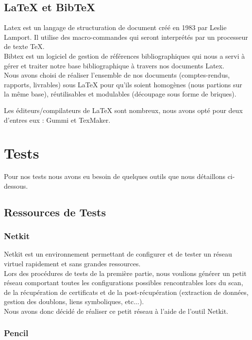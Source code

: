 \subsection{LaTeX et BibTeX}

Latex est un langage de structuration de document créé en 1983 par Leslie Lamport. Il utilise des macro-commandes qui seront interprétés par un processeur de texte TeX.\\
Bibtex est un logiciel de gestion de références bibliographiques qui nous a servi à gérer et traiter notre base bibliographique à travers nos documents Latex.\\

Nous avons choisi de réaliser l'ensemble de nos documents (comptes-rendus, rapports, livrables) sous LaTeX pour qu'ils soient homogènes (nous partions sur la même base), réutilisables et modulables (découpage sous forme de briques).

Les éditeurs/compilateurs de LaTeX sont nombreux, nous avons opté pour deux d'entres eux : Gummi et TexMaker.

\section{Tests}

Pour nos tests nous avons eu besoin de quelques outils que nous détaillons ci-dessous.

\subsection{Ressources de Tests}
\subsubsection{Netkit}

Netkit est un environnement permettant de configurer et de tester un réseau virtuel rapidement et sans grandes ressources.\\
Lors des procédures de tests de la première partie, nous voulions générer un petit réseau comportant toutes les configurations possibles rencontrables lors du scan, de la récupération de certificats et de la post-récupération (extraction de données, gestion des doublons, liens symboliques, etc...).\\
Nous avons donc décidé de réaliser ce petit réseau à l'aide de l'outil Netkit.

\subsubsection{Pencil}

